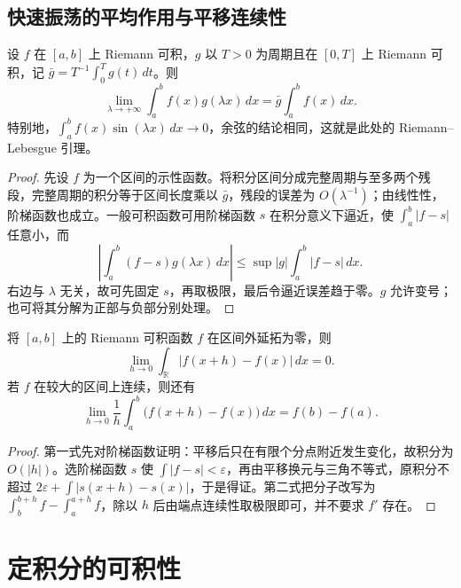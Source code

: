\subsection{快速振荡的平均作用与平移连续性}
\begin{theorem}
\label{thm:pei-int-periodic-average}
设 $f$ 在 $[a,b]$ 上 Riemann 可积，$g$ 以 $T>0$ 为周期且在 $[0,T]$ 上 Riemann 可积，记 $\bar g=T^{-1}\int_0^Tg(t)\,dt$。则
\begin{equation}
 \lim_{\lambda\to+\infty}\int_a^bf(x)g(\lambda x)\,dx
 =\bar g\int_a^bf(x)\,dx.
 \label{eq:pei-int-periodic-average}
\end{equation}
特别地，$\int_a^bf(x)\sin(\lambda x)\,dx\to0$，余弦的结论相同，这就是此处的 Riemann--Lebesgue 引理。
\end{theorem}
\begin{proof}
先设 $f$ 为一个区间的示性函数。将积分区间分成完整周期与至多两个残段，完整周期的积分等于区间长度乘以 $\bar g$，残段的误差为 $O(\lambda^{-1})$；由线性性，阶梯函数也成立。一般可积函数可用阶梯函数 $s$ 在积分意义下逼近，使 $\int_a^b|f-s|$ 任意小，而
\[
 \left|\int_a^b(f-s)g(\lambda x)\,dx\right|
 \le\sup|g|\int_a^b|f-s|\,dx.
\]
右边与 $\lambda$ 无关，故可先固定 $s$，再取极限，最后令逼近误差趋于零。$g$ 允许变号；也可将其分解为正部与负部分别处理。
\end{proof}

\begin{proposition}
\label{prop:pei-int-translation}
将 $[a,b]$ 上的 Riemann 可积函数 $f$ 在区间外延拓为零，则
\[
 \lim_{h\to0}\int_{\mathbb R}|f(x+h)-f(x)|\,dx=0.
\]
若 $f$ 在较大的区间上连续，则还有
\[
 \lim_{h\to0}\frac1h\int_a^b\bigl(f(x+h)-f(x)\bigr)\,dx=f(b)-f(a).
\]
\end{proposition}
\begin{proof}
第一式先对阶梯函数证明：平移后只在有限个分点附近发生变化，故积分为 $O(|h|)$。选阶梯函数 $s$ 使 $\int|f-s|<\varepsilon$，再由平移换元与三角不等式，原积分不超过 $2\varepsilon+\int|s(x+h)-s(x)|$，于是得证。第二式把分子改写为 $\int_b^{b+h}f-\int_a^{a+h}f$，除以 $h$ 后由端点连续性取极限即可，并不要求 $f'$ 存在。
\end{proof}

\section{定积分的可积性}
\label{sec:pei-int-integrability}

